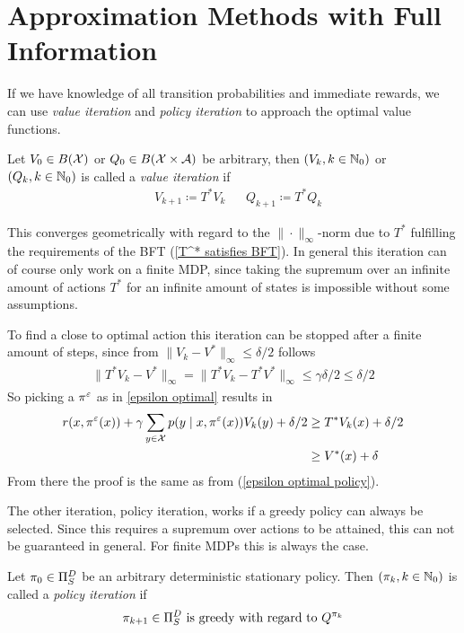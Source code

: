 \section{Approximation Methods with Full Information}
If we have knowledge of all transition probabilities and immediate rewards, we can use \emph{value iteration} and \emph{policy iteration} to approach the optimal value functions.
\begin{definition}Let \(V_0 \in B(\mathcal{X})\) or \(Q_0 \in B(\mathcal{X}\times\mathcal{A})\) be arbitrary, then \((V_k, k\in\mathbb{N}_0)\) or \((Q_k, k\in\mathbb{N}_0)\) is called a \emph{value iteration} if
	\begin{align*}
		&V_{k+1}\coloneqq T^* V_k && Q_{k+1}\coloneqq T^* Q_k
	\end{align*}
\end{definition}
This converges geometrically with regard to the \(\|\cdot\|_\infty\)-norm due to \(T^*\) fulfilling the requirements of the BFT (\ref{T^* satisfies BFT}). In general this iteration can of course only work on a finite MDP, since taking the supremum over an infinite amount of actions \(T^*\) for an infinite amount of states is impossible without some assumptions.

To find a close to optimal action this iteration can be stopped after a finite amount of steps, since from \(\|V_k-V^*\|_\infty\le \delta/2\) follows
\begin{align*}
	\|T^* V_k - V^*\|_\infty=\|T^*V_{k} -T^*V^*\|_\infty\le \gamma \delta/2 \le \delta/2
\end{align*}
So picking a \(\pi^\varepsilon\) as in \ref{epsilon optimal} results in
\begin{align*}
	r(x,\pi^\varepsilon(x))+\gamma \sum_{y\in\mathcal{X}}p(y\mid x, \pi^\varepsilon(x))V_k(y) +\delta/2 
	&\ge T^* V_k(x) + \delta/2 \\
	&\ge V^*(x) + \delta
\end{align*}
From there the proof is the same as from (\ref{epsilon optimal policy}).

The other iteration, policy iteration, works if a greedy policy can always be selected. Since this requires a supremum over actions to be attained, this can not be guaranteed in general. For finite MDPs this is always the case. 
 
\begin{definition} Let \(\pi_0\in\Pi_S^D\) be an arbitrary deterministic stationary policy. Then
	\((\pi_k,k\in\mathbb{N}_0)\) is called a \emph{policy iteration} if
	\[
		\pi_{k+1}\in\Pi_S^D \text{ is greedy with regard to } Q^{\pi_k}
	\]
\end{definition}

